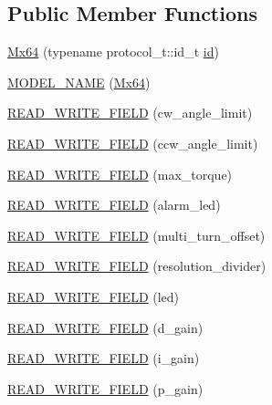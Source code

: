 \subsection*{Public Member Functions}
\begin{DoxyCompactItemize}
\item 
\hyperlink{classdynamixel_1_1servos_1_1_mx64_a49507677ecbba67afab92b28b8d5d888}{Mx64} (typename protocol\+\_\+t\+::id\+\_\+t \hyperlink{classdynamixel_1_1servos_1_1_servo_a2d022081672e25a7bb57b76706e1cc57}{id})
\item 
\hyperlink{classdynamixel_1_1servos_1_1_mx64_a8e4850f873f219a6bd992e00ed2b2893}{M\+O\+D\+E\+L\+\_\+\+N\+A\+M\+E} (\hyperlink{classdynamixel_1_1servos_1_1_mx64}{Mx64})
\item 
\hyperlink{classdynamixel_1_1servos_1_1_mx64_a915d90284393a5556dd447016a450aec}{R\+E\+A\+D\+\_\+\+W\+R\+I\+T\+E\+\_\+\+F\+I\+E\+L\+D} (cw\+\_\+angle\+\_\+limit)
\item 
\hyperlink{classdynamixel_1_1servos_1_1_mx64_a06bccfc8cf925e643716d221bab61c6b}{R\+E\+A\+D\+\_\+\+W\+R\+I\+T\+E\+\_\+\+F\+I\+E\+L\+D} (ccw\+\_\+angle\+\_\+limit)
\item 
\hyperlink{classdynamixel_1_1servos_1_1_mx64_a7dd54fe3e408cd1350c16d828cd60372}{R\+E\+A\+D\+\_\+\+W\+R\+I\+T\+E\+\_\+\+F\+I\+E\+L\+D} (max\+\_\+torque)
\item 
\hyperlink{classdynamixel_1_1servos_1_1_mx64_aba4a199be610791462aadde44525f6c1}{R\+E\+A\+D\+\_\+\+W\+R\+I\+T\+E\+\_\+\+F\+I\+E\+L\+D} (alarm\+\_\+led)
\item 
\hyperlink{classdynamixel_1_1servos_1_1_mx64_a3b2d28d4266c3b36a5fd5c0477dcfbcb}{R\+E\+A\+D\+\_\+\+W\+R\+I\+T\+E\+\_\+\+F\+I\+E\+L\+D} (multi\+\_\+turn\+\_\+offset)
\item 
\hyperlink{classdynamixel_1_1servos_1_1_mx64_abb36dda686dc6d22863b80f2a7479c7a}{R\+E\+A\+D\+\_\+\+W\+R\+I\+T\+E\+\_\+\+F\+I\+E\+L\+D} (resolution\+\_\+divider)
\item 
\hyperlink{classdynamixel_1_1servos_1_1_mx64_a77230a7c22b236092ee03f150649f0fa}{R\+E\+A\+D\+\_\+\+W\+R\+I\+T\+E\+\_\+\+F\+I\+E\+L\+D} (led)
\item 
\hyperlink{classdynamixel_1_1servos_1_1_mx64_aa6f608604d7dbdfeb6502c76bfa676cc}{R\+E\+A\+D\+\_\+\+W\+R\+I\+T\+E\+\_\+\+F\+I\+E\+L\+D} (d\+\_\+gain)
\item 
\hyperlink{classdynamixel_1_1servos_1_1_mx64_ab9d917e4504776a034c072e352222faa}{R\+E\+A\+D\+\_\+\+W\+R\+I\+T\+E\+\_\+\+F\+I\+E\+L\+D} (i\+\_\+gain)
\item 
\hyperlink{classdynamixel_1_1servos_1_1_mx64_aad0f200e1baa38d7cf01dfc7f15eec84}{R\+E\+A\+D\+\_\+\+W\+R\+I\+T\+E\+\_\+\+F\+I\+E\+L\+D} (p\+\_\+gain)

\end{DoxyCompactItemize}
